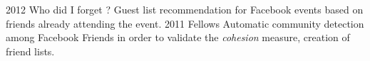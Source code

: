\documentclass[]{friggeri-cv}
\begin{document}
\begin{entrylist}
  \entry
    {2012}
    {Who did I forget ?}
    {\href{ }{ }}
    {Guest list recommendation for Facebook events based on friends already attending the event.}
  \entry
    {2011}
    {Fellows}
    {\href{ }{ }}
    {Automatic community detection among Facebook Friends in order to validate the \emph{cohesion} measure, creation of friend lists.}
\end{entrylist}



%
\end{document}
